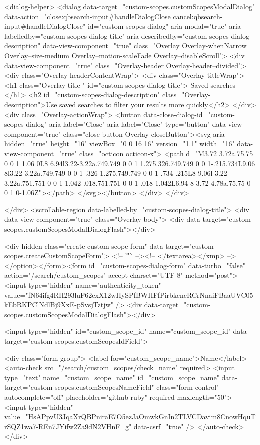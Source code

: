 <dialog-helper>
  <dialog data-target="custom-scopes.customScopesModalDialog" data-action="close:qbsearch-input#handleDialogClose cancel:qbsearch-input#handleDialogClose" id="custom-scopes-dialog" aria-modal="true" aria-labelledby="custom-scopes-dialog-title" aria-describedby="custom-scopes-dialog-description" data-view-component="true" class="Overlay Overlay-whenNarrow Overlay--size-medium Overlay--motion-scaleFade Overlay--disableScroll">
    <div data-view-component="true" class="Overlay-header Overlay-header--divided">
  <div class="Overlay-headerContentWrap">
    <div class="Overlay-titleWrap">
      <h1 class="Overlay-title " id="custom-scopes-dialog-title">
        Saved searches
      </h1>
        <h2 id="custom-scopes-dialog-description" class="Overlay-description">Use saved searches to filter your results more quickly</h2>
    </div>
    <div class="Overlay-actionWrap">
      <button data-close-dialog-id="custom-scopes-dialog" aria-label="Close" aria-label="Close" type="button" data-view-component="true" class="close-button Overlay-closeButton"><svg aria-hidden="true" height="16" viewBox="0 0 16 16" version="1.1" width="16" data-view-component="true" class="octicon octicon-x">
    <path d="M3.72 3.72a.75.75 0 0 1 1.06 0L8 6.94l3.22-3.22a.749.749 0 0 1 1.275.326.749.749 0 0 1-.215.734L9.06 8l3.22 3.22a.749.749 0 0 1-.326 1.275.749.749 0 0 1-.734-.215L8 9.06l-3.22 3.22a.751.751 0 0 1-1.042-.018.751.751 0 0 1-.018-1.042L6.94 8 3.72 4.78a.75.75 0 0 1 0-1.06Z"></path>
</svg></button>
    </div>
  </div>
  
</div>
      <scrollable-region data-labelled-by="custom-scopes-dialog-title">
        <div data-view-component="true" class="Overlay-body">        <div data-target="custom-scopes.customScopesModalDialogFlash"></div>

        <div hidden class="create-custom-scope-form" data-target="custom-scopes.createCustomScopeForm">
        <!-- '"` --><!-- </textarea></xmp> --></option></form><form id="custom-scopes-dialog-form" data-turbo="false" action="/search/custom_scopes" accept-charset="UTF-8" method="post"><input type="hidden" name="authenticity_token" value="fN64ifg4RH293luF62exX12wHySPfBWHFfPirbkcncRCrNnaiFBaaUVC05kEbRKPClNdlBj9XxE-pSvsjTztjw" />
          <div data-target="custom-scopes.customScopesModalDialogFlash"></div>

          <input type="hidden" id="custom_scope_id" name="custom_scope_id" data-target="custom-scopes.customScopesIdField">

          <div class="form-group">
            <label for="custom_scope_name">Name</label>
            <auto-check src="/search/custom_scopes/check_name" required>
              <input
                type="text"
                name="custom_scope_name"
                id="custom_scope_name"
                data-target="custom-scopes.customScopesNameField"
                class="form-control"
                autocomplete="off"
                placeholder="github-ruby"
                required
                maxlength="50">
              <input type="hidden" value="HsAPpvU3JqaXrQBPniraE7O5ezJaOmwkGnIn2TLVCDavim8CnowHquTrSQZ1wa7-REn7JYifw2Za9dN2VHnF_g" data-csrf="true" />
            </auto-check>
          </div>

